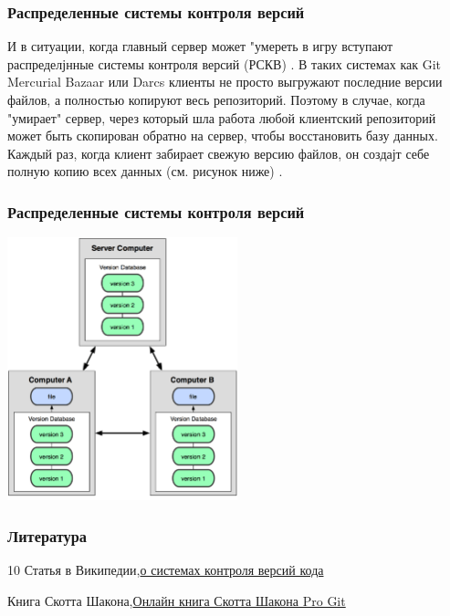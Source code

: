 \documentclass[14pt]{beamer}
\begin{document}
\begin{frame}
	\frametitle{Распределенные системы контроля версий}
	
{\scriptsize 	И в ситуации, когда главный сервер может "умереть в игру вступают распределјнные системы контроля версий (РСКВ) .
	В таких системах как Git Mercurial Bazaar или Darcs клиенты не просто выгружают последние версии файлов, а полностью копируют весь репозиторий. Поэтому в случае, когда "умирает" сервер, через который шла работа любой клиентский репозиторий может быть скопирован обратно на сервер, чтобы восстановить базу данных. Каждый раз, когда клиент забирает свежую версию файлов, он создајт себе полную копию всех данных (см. рисунок ниже) .
}
\end{frame}

\begin{frame}
	\frametitle{Распределенные системы контроля версий}
	\centering
	\includegraphics[width=0.5\textwidth]{DVCS}

\end{frame}

\begin{frame}
	\frametitle{Литература}
	\begin {thebibliography}{10}
	{\sc Статья в Википедии},{\href{https://ru.wikipedia.org/wiki/Система_управления_версиями}{о системах контроля версий кода}}
	
	{\sc Книга Скотта Шакона},{\href{https://git-scm.com/book/en/v2}{Онлайн книга Скотта Шакона Pro Git}}
	\end {thebibliography}
\end{frame}
\end{document}
